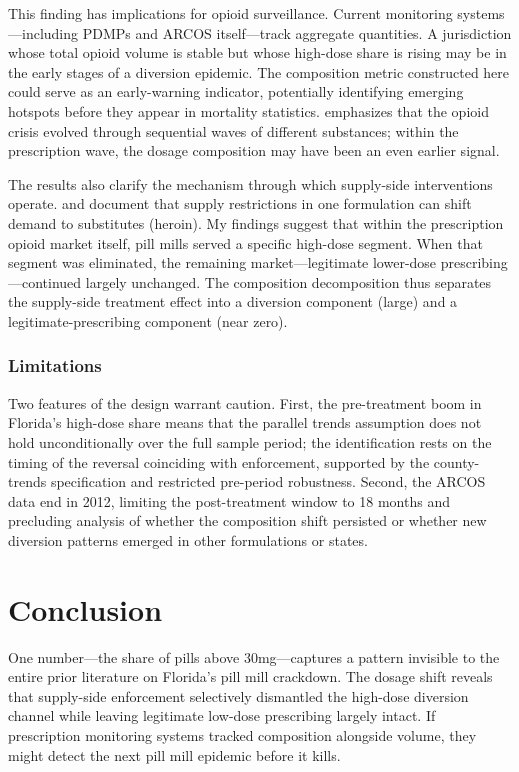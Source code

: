 \documentclass[12pt]{article}
\begin{document}
This finding has implications for opioid surveillance. Current monitoring systems---including PDMPs and ARCOS itself---track aggregate quantities. A jurisdiction whose total opioid volume is stable but whose high-dose share is rising may be in the early stages of a diversion epidemic. The composition metric constructed here could serve as an early-warning indicator, potentially identifying emerging hotspots before they appear in mortality statistics. \citet{ruhm2019drivers} emphasizes that the opioid crisis evolved through sequential waves of different substances; within the prescription wave, the dosage composition may have been an even earlier signal.

The results also clarify the mechanism through which supply-side interventions operate. \citet{alpert2018supply} and \citet{evans2019reformulation} document that supply restrictions in one formulation can shift demand to substitutes (heroin). My findings suggest that within the prescription opioid market itself, pill mills served a specific high-dose segment. When that segment was eliminated, the remaining market---legitimate lower-dose prescribing---continued largely unchanged. The composition decomposition thus separates the supply-side treatment effect into a diversion component (large) and a legitimate-prescribing component (near zero).

\subsubsection*{Limitations} Two features of the design warrant caution. First, the pre-treatment boom in Florida's high-dose share means that the parallel trends assumption does not hold unconditionally over the full sample period; the identification rests on the timing of the reversal coinciding with enforcement, supported by the county-trends specification and restricted pre-period robustness. Second, the ARCOS data end in 2012, limiting the post-treatment window to 18 months and precluding analysis of whether the composition shift persisted or whether new diversion patterns emerged in other formulations or states.


\section{Conclusion}

One number---the share of pills above 30mg---captures a pattern invisible to the entire prior literature on Florida's pill mill crackdown. The dosage shift reveals that supply-side enforcement selectively dismantled the high-dose diversion channel while leaving legitimate low-dose prescribing largely intact. If prescription monitoring systems tracked composition alongside volume, they might detect the next pill mill epidemic before it kills.
\end{document}
